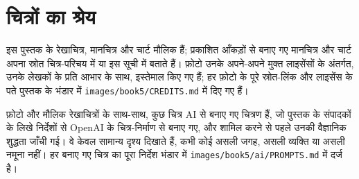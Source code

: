 \chapter*{चित्रों का श्रेय}

इस पुस्तक के रेखाचित्र, मानचित्र और चार्ट मौलिक हैं; प्रकाशित आँकड़ों से बनाए गए मानचित्र और
चार्ट अपना स्रोत चित्र-परिचय में या इस सूची में बताते हैं। फ़ोटो उनके अपने-अपने मुक्त लाइसेंसों के
अंतर्गत, उनके लेखकों के प्रति आभार के साथ, इस्तेमाल किए गए हैं; हर फ़ोटो के पूरे स्रोत-लिंक और
लाइसेंस के पते पुस्तक के भंडार में \texttt{images/book5/CREDITS.md} में दिए गए हैं।

\bigskip
फ़ोटो और मौलिक रेखाचित्रों के साथ-साथ, कुछ चित्र AI से बनाए गए चित्रण हैं, जो पुस्तक के
संपादकों के लिखे निर्देशों से OpenAI के चित्र-निर्माण से बनाए गए, और शामिल करने से पहले उनकी
वैज्ञानिक शुद्धता जाँची गई। वे केवल सामान्य दृश्य दिखाते हैं, कभी कोई असली जगह, असली व्यक्ति
या असली नमूना नहीं। हर बनाए गए चित्र का पूरा निर्देश भंडार में
\texttt{images/book5/ai/PROMPTS.md} में दर्ज है।

